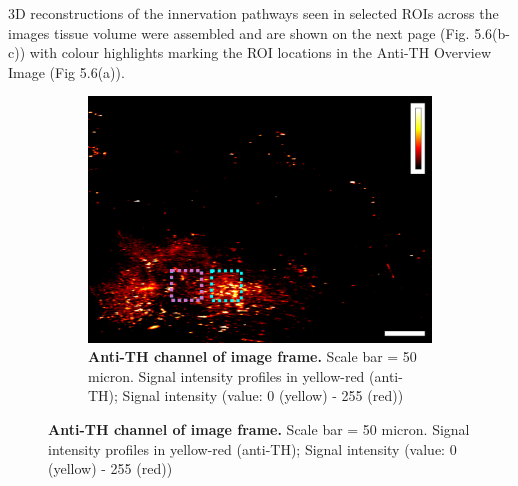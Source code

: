 3D reconstructions of the innervation pathways seen in selected ROIs across the images tissue volume were assembled and are shown on the next page (Fig. 5.6(b-c)) with colour highlights marking the ROI locations in the Anti-TH Overview Image (Fig 5.6(a)).

\begin{figure}[H]
    \centering
    \begin{subfigure}[t]{0.6\textwidth}
    \includegraphics[width=1\linewidth]{Images/antith_roi_overview.png}
    \caption{\textbf{Anti-TH channel of image frame.} Scale bar = 50 micron. Signal intensity profiles in yellow-red (anti-TH); Signal intensity (value: 0 (yellow) - 255 (red))}
    \end{subfigure}
    \medskip
    

\end{figure}
